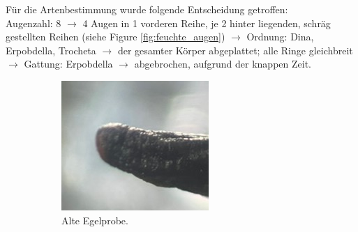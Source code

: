 \documentclass[oneside,10pt,a4paper]{report}
\begin{document}
				Für die Artenbestimmung wurde folgende Entscheidung getroffen:\\
				Augenzahl: 8 $\rightarrow$ 4 Augen in 1 vorderen Reihe, je 2 hinter liegenden, schräg gestellten Reihen (siehe Figure \ref{fig:feuchte_augen}) $\rightarrow$  Ordnung: Dina, Erpobdella, Trocheta $\rightarrow$ der gesamter Körper abgeplattet; alle Ringe gleichbreit $\rightarrow$  Gattung: Erpobdella $\rightarrow$  abgebrochen, aufgrund der knappen Zeit.\\
				\begin{figure}[H]
					\centering
					\begin{subfigure}[b]{0.55\textwidth}
						\includegraphics[width=\textwidth]{trockene_dichotom.jpg}
						\caption{Alte Egelprobe.}
						\label{fig: trockene_augen}
					\end{subfigure}
					\hfill
					\begin{subfigure}[b]{0.37\textwidth}

\end{subfigure}
\end{figure}
\end{document}
